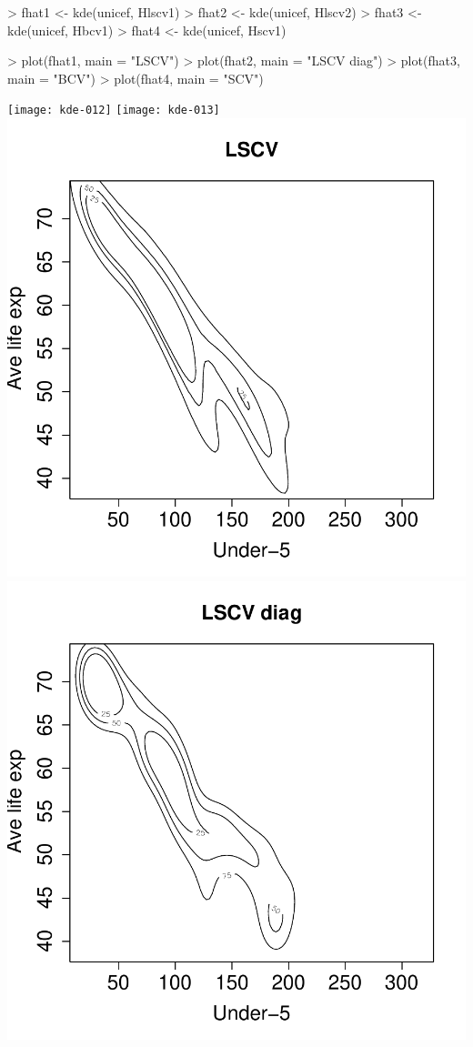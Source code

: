 \documentclass[a4paper,11pt]{article}
\begin{document}
\begin{Schunk}
\begin{Sinput}
> fhat1 <- kde(unicef, Hlscv1)
> fhat2 <- kde(unicef, Hlscv2)
> fhat3 <- kde(unicef, Hbcv1)
> fhat4 <- kde(unicef, Hscv1)
\end{Sinput}
\end{Schunk}
\begin{Schunk}
\begin{Sinput}
> plot(fhat1, main = "LSCV")
> plot(fhat2, main = "LSCV diag")
> plot(fhat3, main = "BCV")
> plot(fhat4, main = "SCV")
\end{Sinput}
\end{Schunk}
\begin{center}
\texttt{[image: kde-012]}
\texttt{[image: kde-013]}
\includegraphics{kde-014}
\includegraphics{kde-015}
\end{center}
\end{document}

